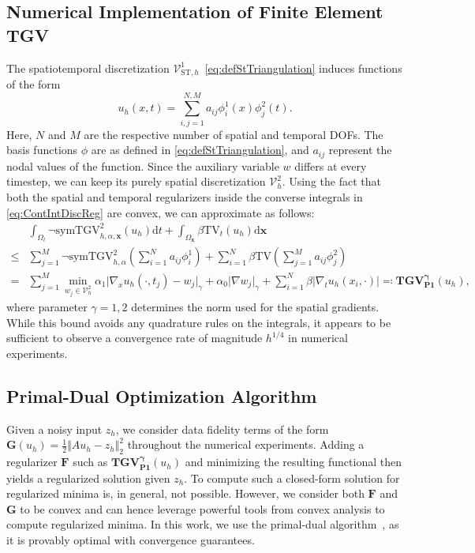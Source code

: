\documentclass{article}
\newcommand{\dx}{\mathrm{d}}
\newcommand{\NSymTGV}{\neg \mathrm{symTGV}}
\newcommand{\TV}{\mathrm{TV}}
\newcommand{\OmegaSpace}{\Omega_\mathbf{x}}
\newcommand{\OmegaTime}{\Omega_t}
\begin{document}
	\subsection{Numerical Implementation of Finite Element TGV}
	The spatiotemporal discretization $\mathcal{V}_{\mathrm{ST},h}^1$~\eqref{eq:defStTriangulation} induces functions of the form
	\begin{equation}
		\label{eq:SpaceTimeDiscFunction}
		u_h(x,t) = \sum_{i,j=1}^{N,M}a_{ij}\phi^1_i(x)\phi^2_j(t).
	\end{equation}
	Here, $ N$ and $ M$ are the respective number of spatial and temporal DOFs.
	The basis functions $\phi$ are as defined in \eqref{eq:defStTriangulation}, and $a_{ij}$ represent the nodal values of the function.
	Since the auxiliary variable $w$ differs at every timestep, we can keep its purely spatial discretization $\mathcal{V}_h^2$. 
	Using the fact that both the spatial and temporal regularizers inside the converse integrals in \eqref{eq:ContIntDiscReg} are convex, we can approximate as follows:
	\begin{equation}
		\label{eq:usedTGVAlgo}
		\begin{aligned}
			&\int_{\OmegaTime} \NSymTGV_{h,\alpha, \mathbf{x}}^2(u_h) \dx t + \int_{\OmegaSpace} \beta \TV_t(u_h) \dx \mathbf{x}\\
			\leq& \sum_{j=1}^M\NSymTGV_{h,\alpha}^2\left(\sum_{i=1}^Na_{ij}\phi_i^1\right) + \sum_{i=1}^N\beta \TV\left(\sum_{j=1}^M a_{ij}\phi_j^2\right) \\
			=&\sum_{j=1}^M\min_{w_j\in\mathcal{V}_h^2}\alpha_1 \vert \nabla_x u_h(\cdot, t_j) - w_j\vert_\gamma +\alpha_0\vert \nabla w_j\vert_\gamma +  \sum_{i=1}^N\beta \vert\nabla_t u_h(x_i, \cdot)\vert\eqqcolon\mathbf{TGV_{P1}^\gamma}(u_h),
		\end{aligned}
	\end{equation}
	where parameter $\gamma=1, 2$ determines the norm used for the spatial gradients.
	While this bound avoids any quadrature rules on the integrals, it appears to be sufficient to observe a convergence rate of magnitude $h^{1/4}$ in numerical experiments.
	
	\subsection{Primal-Dual Optimization Algorithm}	
	Given a noisy input $z_h$, we consider data fidelity terms of the form $\mathbf{G}(u_h) = \frac{1}{2}\Vert Au_h - z_h\Vert_2^2$ throughout the numerical experiments.
	Adding a regularizer $\mathbf{F}$ such as $\mathbf{TGV_{P1}^\gamma}(u_h)$ and minimizing the resulting functional then yields a regularized solution given $z_h$.
	To compute such a closed-form solution for regularized minima is, in general, not possible.
	However, we consider both $\mathbf{F}$ and $\mathbf{G}$ to be convex and can hence leverage powerful tools from convex analysis to compute regularized minima.
	In this work, we use the primal-dual algorithm~\cite{Ch11}, as it is provably optimal with convergence guarantees.
	
\end{document}

